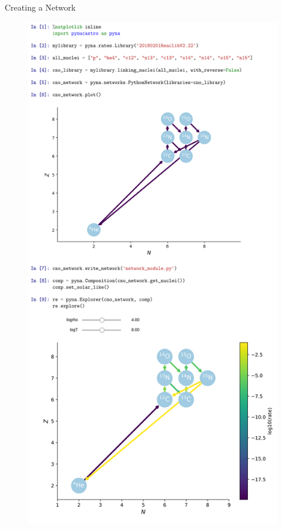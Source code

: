 \documentclass[final]{beamer}
\newlength{\onecolwid}
\newlength{\twocolwid}
\begin{document}
\begin{frame}[t]
\begin{columns}[t]
\begin{column}{\twocolwid}
\begin{columns}[t,totalwidth=\twocolwid]
\begin{column}{\onecolwid}
\begin{block}{Creating a Network}
\begin{figure}
\includegraphics[width=\linewidth]{figures/library-examples-nuclei.png}
\end{figure}


\end{block}
\end{column}
\end{columns}
\end{column}
\end{columns}
\end{frame}
\end{document}
